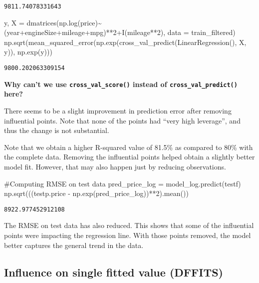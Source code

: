 \documentclass[
  letterpaper,
  DIV=11,
  numbers=noendperiod]{scrreprt}
\newenvironment{Shaded}{\begin{snugshade}}{\end{snugshade}}
\newcommand{\CommentTok}[1]{\textcolor[rgb]{0.37,0.37,0.37}{#1}}
\newcommand{\DecValTok}[1]{\textcolor[rgb]{0.68,0.00,0.00}{#1}}
\newcommand{\NormalTok}[1]{\textcolor[rgb]{0.00,0.23,0.31}{#1}}
\newcommand{\OperatorTok}[1]{\textcolor[rgb]{0.37,0.37,0.37}{#1}}
\newcommand{\StringTok}[1]{\textcolor[rgb]{0.13,0.47,0.30}{#1}}
\begin{document}
\begin{verbatim}
9811.74078331643
\end{verbatim}

\begin{Shaded}
\begin{Highlighting}[]
\NormalTok{y, X }\OperatorTok{=}\NormalTok{ dmatrices(}\StringTok{\textquotesingle{}np.log(price)\textasciitilde{}(year+engineSize+mileage+mpg)**2+I(mileage**2)\textquotesingle{}}\NormalTok{, data }\OperatorTok{=}\NormalTok{ train\_filtered)}
\NormalTok{np.sqrt(mean\_squared\_error(np.exp(cross\_val\_predict(LinearRegression(), X, y)), np.exp(y)))}
\end{Highlighting}
\end{Shaded}

\begin{verbatim}
9800.202063309154
\end{verbatim}

\textbf{Why can't we use \texttt{cross\_val\_score()} instead of
\texttt{cross\_val\_predict()} here?}

There seems to be a slight improvement in prediction error after
removing influential points. Note that none of the points had ``very
high leverage'', and thus the change is not substantial.

Note that we obtain a higher R-squared value of 81.5\% as compared to
80\% with the complete data. Removing the influential points helped
obtain a slightly better model fit. However, that may also happen just
by reducing observations.

\begin{Shaded}
\begin{Highlighting}[]
\CommentTok{\#Computing RMSE on test data}
\NormalTok{pred\_price\_log }\OperatorTok{=}\NormalTok{ model\_log.predict(testf)}
\NormalTok{np.sqrt(((testp.price }\OperatorTok{{-}}\NormalTok{ np.exp(pred\_price\_log))}\OperatorTok{**}\DecValTok{2}\NormalTok{).mean())}
\end{Highlighting}
\end{Shaded}

\begin{verbatim}
8922.977452912108
\end{verbatim}

The RMSE on test data has also reduced. This shows that some of the
influential points were impacting the regression line. With those points
removed, the model better captures the general trend in the data.

\subsection{Influence on single fitted value
(DFFITS)}\label{influence-on-single-fitted-value-dffits}
\end{document}
